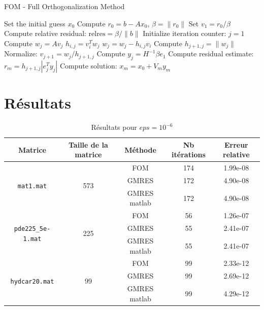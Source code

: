 \documentclass[12pt,a4paper]{article}
\begin{document}
\begin{algorithm}
    \caption{FOM - Full Orthogonalization Method}
    \begin{algorithmic}[1] %
        \State Set the initial guess $x_0$
        \State Compute $r_0 = b - A x_0$, $\beta = \|r_0\|$
        \State Set $v_1 = r_0 / \beta$
        \State Compute relative residual: $\text{relres} = \beta / \|b\|$
        \State Initialize iteration counter: $j = 1$
            \State Compute $w_j = A v_j$
                \State $h_{i,j} = v_i^T w_j$
                \State $w_j = w_j - h_{i,j} v_i$
            \EndFor
            \State Compute $h_{j+1,j} = \|w_j\|$
            \State Normalize: $v_{j+1} = w_j / h_{j+1,j}$
            \State Compute $y_j = H^{-1} \beta e_1$
            \State Compute residual estimate: $r_m = h_{j+1,j} |e_j^T y_j|$
        \EndWhile
        \State Compute solution: $x_m = x_0 + V_m y_m$
    \end{algorithmic}
\end{algorithm}

\section{Résultats}

\begin{table}[H]
    \centering
    \begin{tabular}{|c|c|c|c|c|}
    \hline
    \rowcolor{gray!20} \textbf{Matrice} & \textbf{Taille de la matrice} & \textbf{Méthode} & \textbf{Nb itérations} & \textbf{Erreur relative} \\
    \hline
    \multirow{3}{*}{\texttt{mat1.mat}} & \multirow{3}{*}{573} & FOM & 174 & 1.99e-08 \\
    \cline{3-5}
     &  & GMRES & 172 & 4.90e-08 \\
    \cline{3-5}
     &  & GMRES matlab & 172 & 4.90e-08 \\
    \hline
    \multirow{3}{*}{\texttt{pde225\_5e-1.mat}} & \multirow{3}{*}{225} & FOM & 56 & 1.26e-07 \\
    \cline{3-5}
     &  & GMRES & 55 & 2.41e-07 \\
    \cline{3-5}
     &  & GMRES matlab & 55 & 2.41e-07 \\
    \hline
    \multirow{3}{*}{\texttt{hydcar20.mat}} & \multirow{3}{*}{99} & FOM & 99 & 2.33e-12 \\
    \cline{3-5}
     &  & GMRES & 99 & 2.69e-12 \\
    \cline{3-5}
     &  & GMRES matlab & 99 & 4.29e-12 \\
    \hline
    \end{tabular}
    \caption{Résultats pour $eps=10^{-6}$}
\end{table}
\end{document}
